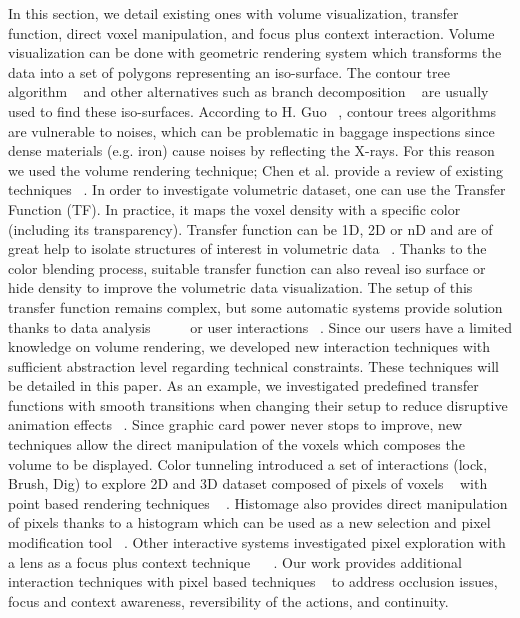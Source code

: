 In this section, we detail existing ones with volume visualization, transfer function, direct voxel manipulation, and focus plus context interaction.
Volume visualization can be done with geometric rendering system which transforms the data into a set of polygons representing an iso-surface. The contour tree algorithm ~\cite{carr_computing_2000} and other alternatives such as branch decomposition ~\cite{pascucci_multi-resolution_2004} are usually used to find these iso-surfaces. According to H. Guo ~\cite{guo_local_2013}, contour trees algorithms are vulnerable to noises, which can be problematic in baggage inspections since dense materials (e.g. iron) cause noises by reflecting the X-rays. For this reason we used the volume rendering technique; Chen et al. provide a review of existing techniques ~\cite{chen_3-d_2000}.
In order to investigate volumetric dataset, one can use the Transfer Function (TF). In practice, it maps the voxel density with a specific color (including its transparency). Transfer function can be 1D, 2D or nD and are of great help to isolate structures of interest in volumetric data ~\cite{kniss_multidimensional_2002}. Thanks to the color blending process, suitable transfer function can also reveal iso surface or hide density to improve the volumetric data visualization. The setup of this transfer function remains complex, but some automatic systems provide solution thanks to data analysis ~\cite{correa_size-based_2008} ~\cite{sereda_visualization_2006} ~\cite{patel_moment_2009} or user interactions ~\cite{guo_wysiwyg_2011}. Since our users have a limited knowledge on volume rendering, we developed new interaction techniques with sufficient abstraction level regarding technical constraints. These techniques will be detailed in this paper. As an example, we investigated predefined transfer functions with smooth transitions when changing their setup to reduce disruptive animation effects ~\cite{tversky_animation:_2002}.
Since graphic card power never stops to improve, new techniques allow the direct manipulation of the voxels which composes the volume to be displayed. Color tunneling introduced a set of interactions (lock, Brush, Dig) to explore 2D and 3D dataset composed of pixels of voxels ~\cite{hurter_interactive_2014} with point based rendering techniques ~\cite{sainz_point-based_2004} . Histomage also provides direct manipulation of pixels thanks to a histogram which can be used as a new selection and pixel modification tool ~\cite{chevalier_histomages:_2012}. Other interactive systems investigated pixel exploration with a lens as a focus plus context technique ~\cite{elmqvist_color_2011} ~\cite{hurter_moleview:_2011}. Our work provides additional interaction techniques with pixel based techniques ~\cite{hurter_interactive_2014} to address occlusion issues, focus and context awareness, reversibility of the actions, and continuity.  